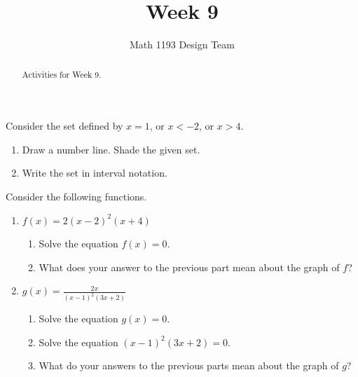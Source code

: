 \documentclass[noauthor,noinstructornotes]{ximera}
\title{Week 9}
\author{Math 1193 Design Team}
\begin{document}
\begin{abstract}
    Activities for Week 9.
\end{abstract}
\maketitle

\begin{problem}
Consider the set defined by \(x = 1\), or \(x < -2\), or \(x > 4\).

\begin{enumerate}
    \item Draw a number line. Shade the given set.
    \item Write the set in interval notation.
\end{enumerate}
\end{problem}

\begin{problem}
Consider the following functions.

\begin{enumerate}
    \item \(f(x) = 2(x - 2)^2(x + 4)\)
    \begin{enumerate}
        \item Solve the equation \(f(x) = 0\).
        \item What does your answer to the previous part mean about the graph of \(f\)?
    \end{enumerate}
    \item \(g(x) = \frac{2x}{(x - 1)^2(3x + 2)}\)
    \begin{enumerate}
        \item Solve the equation \(g(x) = 0\).
        \item Solve the equation \((x - 1)^2(3x + 2) = 0\).
        \item What do your answers to the previous parts mean about the graph of \(g\)?
    \end{enumerate}
\end{enumerate}

\end{problem}
\end{document}
